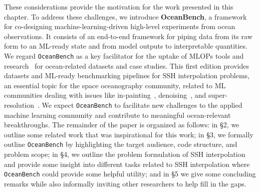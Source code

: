 
These considerations provide the motivation for the work presented in this chapter. To address these challenges, we introduce \textbf{OceanBench}, a framework for co-designing machine-learning-driven high-level experiments from ocean observations. 
It consists of an end-to-end framework for piping data from its raw form to an ML-ready state and from model outputs to interpretable quantities. 
We regard \texttt{OceanBench} as a key facilitator for the uptake of MLOPs tools and research~\cite{MLOPS1,MLOPS2} for ocean-related datasets and case studies. This first edition provides datasets and ML-ready benchmarking pipelines for SSH interpolation problems, an essential topic for the space oceanography community, related to ML communities dealing with issues like in-painting~\cite{InPaintingSurvey}, denoising~\cite{DENOISESURVEY,DENOISESURVEY2}, and super-resolution~\cite{SuperResSurvey}. 
We expect \texttt{OceanBench} to facilitate new challenges to the applied machine learning community and contribute to meaningful ocean-relevant breakthroughs.
%
The remainder of the paper is organized as follows: in \S2, we outline some related work that was inspirational for this work; in \S3, we formally outline \texttt{OceanBench} by highlighting the target audience, code structure, and problem scope; in \S4, we outline the problem formulation of SSH interpolation and provide some insight into different tasks related to SSH interpolation where \texttt{OceanBench} could provide some helpful utility; and in \S5 we give some concluding remarks while also informally inviting other researchers to help fill in the gaps.

